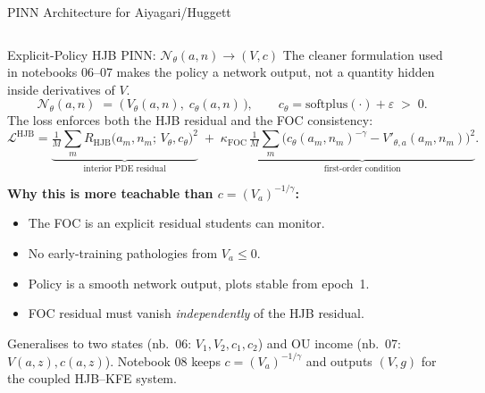 \documentclass[aspectratio=169,11pt]{beamer}
\newcommand{\emphc}[1]{\textcolor{harvardcrimson}{#1}}
\begin{document}
\begin{frame}{PINN Architecture for Aiyagari/Huggett}
\begin{columns}[T]
\begin{center}
\end{center}
\end{columns}
\end{frame}

\begin{frame}{Explicit-Policy HJB PINN: $\mathcal{N}_\theta(a,n) \to (V, c)$}
\small
The cleaner formulation used in notebooks 06--07 makes the policy a network output, not a quantity hidden inside derivatives of $V$.
\vspace{-0.3em}
\[
\mathcal{N}_\theta(a, n) \;=\; \bigl(\,V_\theta(a, n),\; c_\theta(a, n)\,\bigr),
\qquad c_\theta = \mathrm{softplus}(\cdot) + \varepsilon \;>\; 0.
\]
The loss enforces \emphc{both} the HJB residual \emphc{and} the FOC consistency:
\vspace{-0.3em}
\[
\mathcal{L}^{\text{HJB}} =
\underbrace{\tfrac{1}{M}\sum_m R_{\text{HJB}}\bigl(a_m, n_m;\, V_\theta, c_\theta\bigr)^2}_{\text{interior PDE residual}}
\;+\;
\kappa_{\text{FOC}}\,\underbrace{\tfrac{1}{M}\sum_m \bigl(c_\theta(a_m,n_m)^{-\gamma} - V'_{\theta,a}(a_m,n_m)\bigr)^2}_{\text{first-order condition}}.
\]

\textbf{Why this is more teachable than $c = (V_a)^{-1/\gamma}$:}
\begin{itemize}\itemsep0pt
    \item The FOC is an \emphc{explicit residual} students can monitor.
    \item No early-training pathologies from $V_a \le 0$.
    \item Policy is a smooth network output, plots stable from epoch~1.
    \item FOC residual must vanish \emph{independently} of the HJB residual.
\end{itemize}

{\footnotesize Generalises to two states (nb.\ 06: $V_1, V_2, c_1, c_2$) and OU income (nb.\ 07: $V(a,z), c(a,z)$). Notebook 08 keeps $c=(V_a)^{-1/\gamma}$ and outputs $(V,g)$ for the coupled HJB--KFE system.}
\end{frame}
\end{document}
